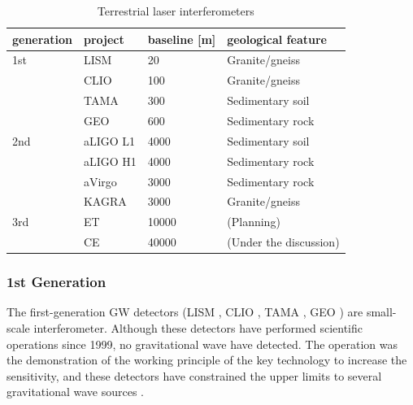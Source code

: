 \begin{table}[h] 
  \begin{center}
    \caption{Terrestrial laser interferometers \cite{chen2017brief,beker2013low}}\label{tb:tb101}
    \begin{tabular}{llll} 
      \hline
      generation &project & baseline [m] & geological feature \\ \hline \hline
      1st &LISM  & 20    & Granite/gneiss \\ 
      &CLIO  & 100   & Granite/gneiss \\
      &TAMA  & 300   & Sedimentary soil \cite{1970449}\\ 
      &GEO   & 600   & Sedimentary rock \\ \hline
      2nd &aLIGO L1 & 4000  & Sedimentary soil \\
      &aLIGO H1 & 4000  & Sedimentary rock \\
      &aVirgo   & 3000  & Sedimentary rock \\
      &KAGRA   & 3000  & Granite/gneiss \\ \hline
      3rd &ET      & 10000 & (Planning) \\
          &CE      & 40000 & (Under the discussion) \\
      \hline
    \end{tabular}
  \end{center}
\end{table}


\subsubsection{1st Generation}
The first-generation GW detectors (LISM \cite{sato2004ultrastable}, CLIO \cite{ohashi2003design}, TAMA \cite{ando2001stable}, GEO \cite{grote2010geo}) are small-scale interferometer. Although these detectors have performed scientific operations since 1999, no gravitational wave have detected. The operation was the demonstration of the working principle of the key technology to increase the sensitivity, and these detectors have constrained the upper limits to several gravitational wave sources \cite{takahashi2004coincidence, Fairhurst2011}.


